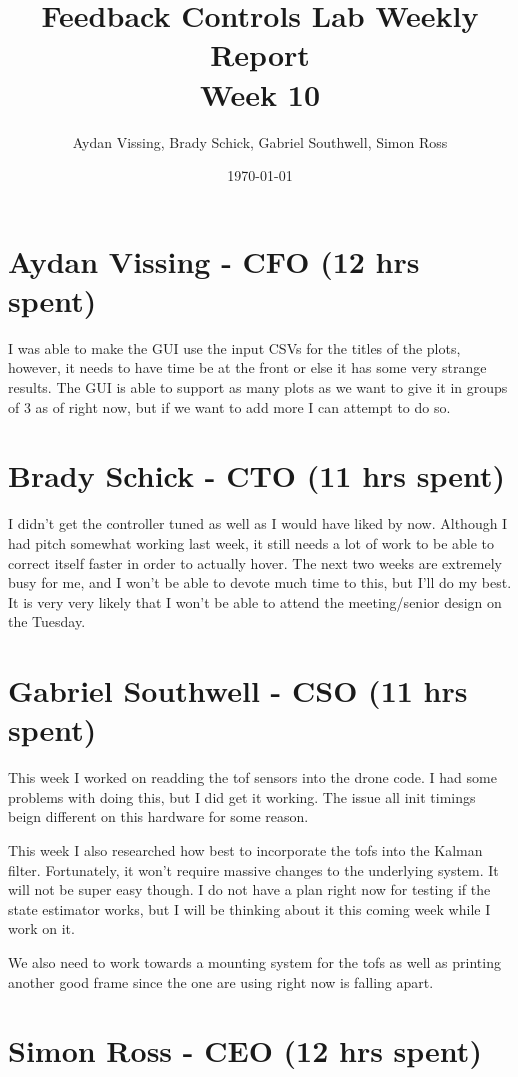 \documentclass[12pt, titlepage]{article}
\title{Feedback Controls Lab Weekly Report \\ \normalsize{Week 10}}
\author{Aydan Vissing, Brady Schick, Gabriel Southwell, Simon Ross}
\date{\today}
\begin{document}
\maketitle

\section*{Aydan Vissing - CFO (12 hrs spent)}

I was able to make the GUI use the input CSVs for the titles of the plots, however, it needs to have time be at the front or else it has some very strange results. The GUI is able to support as many plots as we want to give it in groups of 3 as of right now, but if we want to add more I can attempt to do so. 

\section*{Brady Schick - CTO (11 hrs spent)}

I didn't get the controller tuned as well as I would have liked by now. Although I had pitch somewhat working last week, it still needs a lot of work to be able to correct itself faster in order to actually hover. The next two weeks are extremely busy for me, and I won't be able to devote much time to this, but I'll do my best. It is very very likely that I won't be able to attend the meeting/senior design on the Tuesday.

\section*{Gabriel Southwell - CSO (11 hrs spent)}

This week I worked on readding the tof sensors into the drone code. I had some problems with doing this, but I did get it working. The issue all init timings beign different on this hardware for some reason.

This week I also researched how best to incorporate the tofs into the Kalman filter. Fortunately, it won't require massive changes to the underlying system. It will not be super easy though. I do not have a plan right now for testing if the state estimator works, but I will be thinking about it this coming week while I work on it. 

We also need to work towards a mounting system for the tofs as well as printing another good frame since the one are using right now is falling apart. 

\section*{Simon Ross - CEO (12 hrs spent)}
\end{document}
